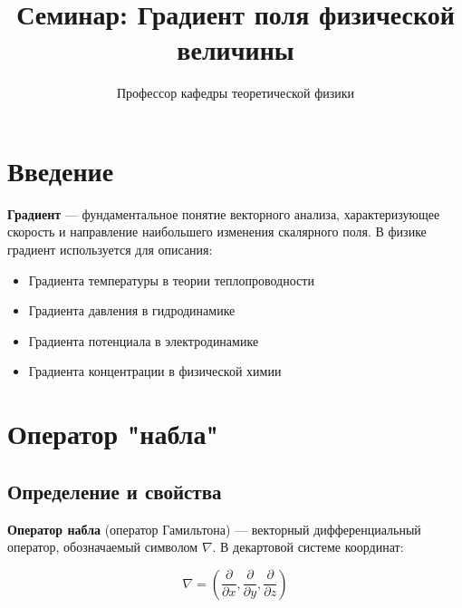 \documentclass[12pt]{article}
\title{Семинар: Градиент поля физической величины}
\author{Профессор кафедры теоретической физики}
\date{}
\begin{document}
	
	\maketitle
	
	\section*{Введение}
	
	\textbf{Градиент} — фундаментальное понятие векторного анализа, характеризующее скорость и направление наибольшего изменения скалярного поля. В физике градиент используется для описания:
	\begin{itemize}
		\item Градиента температуры в теории теплопроводности
		\item Градиента давления в гидродинамике
		\item Градиента потенциала в электродинамике
		\item Градиента концентрации в физической химии
	\end{itemize}
	
	\section{Оператор "набла"}
	
	\subsection{Определение и свойства}
	
	\textbf{Оператор набла} (оператор Гамильтона) — векторный дифференциальный оператор, обозначаемый символом $\nabla$. В декартовой системе координат:
	
	\[
	\nabla = \left(\frac{\partial}{\partial x}, \frac{\partial}{\partial y}, \frac{\partial}{\partial z}\right)
	\]
	
	
\end{document}
